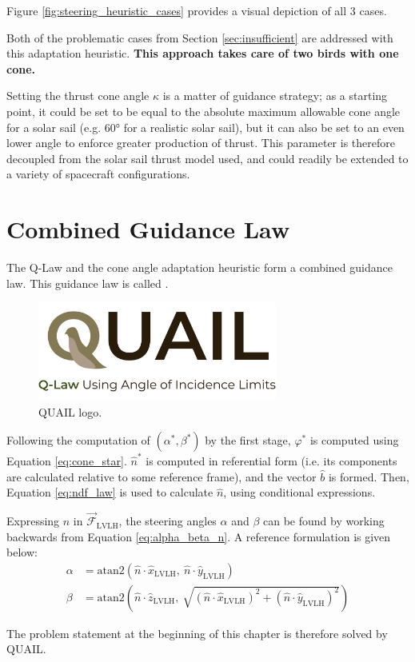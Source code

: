 
Figure \ref{fig:steering_heuristic_cases} provides a visual depiction of all 3 cases.



Both of the problematic cases from Section \ref{sec:insufficient} are addressed with this adaptation heuristic. \textbf{This approach takes care of two birds with one cone.}

Setting the thrust cone angle \(\kappa\) is a matter of guidance strategy; as a starting point, it could be set to be equal to the absolute maximum allowable cone angle for a solar sail (e.g. \ang{60} for a realistic solar sail), but it can also be set to an even lower angle to enforce greater production of thrust. This parameter is therefore decoupled from the solar sail thrust model used, and could readily be extended to a variety of spacecraft configurations.

\section{Combined Guidance Law}
The Q-Law and the cone angle adaptation heuristic form a combined guidance law. This guidance law is called .

\begin{figure}[H]
    \centering
    \includegraphics[width=0.7\textwidth]{figures/quail_logo_v2.pdf}
    \caption{QUAIL logo.}
    \label{fig:quail_logo}
\end{figure}

Following the computation of \((\alpha^*, \beta^*)\) by the first stage, \(\varphi^*\) is computed using Equation \ref{eq:cone_star}. \(\hat{n}^*\) is computed in referential form (i.e. its components are calculated relative to some reference frame), and the vector \(\hat{b}\) is formed. Then, Equation \ref{eq:ndf_law} is used to calculate \(\hat{n}\), using conditional expressions.

Expressing \(\hat{n}\) in \(\vec{\mathcal{F}}_{\text{LVLH}}\), the steering angles \(\alpha\) and \(\beta\) can be found by working backwards from Equation \ref{eq:alpha_beta_n}. A reference formulation is given below:
\begin{align*}
    \alpha & = \mathrm{atan2}\left(\hat{n} \cdot \hat{x}_{\text{LVLH}}, \ \hat{n} \cdot \hat{y}_{\text{LVLH}}\right)                                                      \\
    \beta  & = \mathrm{atan2}\left(\hat{n} \cdot \hat{z}_{\text{LVLH}}, \ \sqrt{(\hat{n} \cdot \hat{x}_{\text{LVLH}})^2 + (\hat{n} \cdot \hat{y}_{\text{LVLH}})^2}\right)
\end{align*}

The problem statement at the beginning of this chapter is therefore solved by QUAIL.